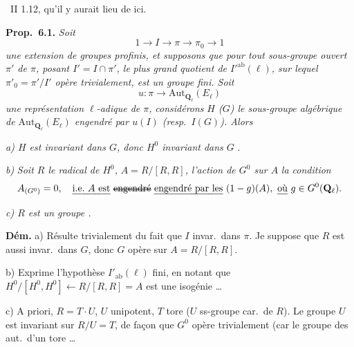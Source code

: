 \documentclass[11pt,a4paper]{article}
\begin{document}
\ II 1.12, qu'il y aurait lieu de  ici.

\textbf{Prop.\ 6.1.} \emph{Soit}
\[ 1 \longrightarrow I \longrightarrow \pi \longrightarrow \pi_{0} \longrightarrow 1 \]
\emph{une extension de groupes profinis, et supposons que pour tout sous-groupe ouvert $\pi'$ de $\pi$, posant $I' = I \cap \pi'$, le}  \emph{ plus grand quotient  de $I'^{\mathrm{ab}}(\ell)$, sur lequel $\pi'_{0} = \pi'/I'$ opère trivialement, est un groupe fini. Soit}
\[ u : \pi \longrightarrow \mathrm{Aut}_{\mathbf{Q}_{\ell}}(E_{\ell}) \]
\emph{une représentation $\ell$-adique de $\pi$,}  \emph{considérons}  \emph{$H$ ($G$) le sous-groupe algébrique de $\mathrm{Aut}_{\mathbf{Q}_{\ell}}(E_{\ell})$ engendré par $u(I)$ (resp.\ $I(G)$). Alors}

\emph{a) $H$ est invariant dans $G$, donc $H^{0}$ invariant dans $G$} .

\emph{b)}  \emph{Soit $R$ le radical de $H^{0}$,}  \emph{$A = R/[R,R]$,} \emph{ l'action de $G^{0}$ sur $A$}   \emph{\ill{} \ill{} la condition}
\[ A_{(G^{0})} = 0 , \quad \text{\emph{i.e.\ $A$ est} \struck{\emph{engendré}} \emph{engendré par les} } (1-g)(A), \ \text{\emph{où} } g \in G^{0}(\mathbf{Q}_{\ell}) . \]

\emph{c) $R$ est un groupe .}

\textbf{Dém.} a) Résulte trivialement du fait que $I$ invar.\ dans $\pi$. Je suppose que $R$ est aussi invar.\ dans $G$, donc $G$ opère sur $A = R/[R,R]$.

b) Exprime l'hypothèse $I'_{\mathrm{ab}}(\ell)$ fini, en notant que $H^{0}/[H^{0},H^{0}] \longleftarrow R/[R,R] = A$ est une isogénie …

c) A priori, $R = T \cdot U$, $U$ unipotent, $T$ tore ($U$ ss-groupe car.\ de $R$). Le groupe $U$ est invariant  sur $R/U = T$, de façon que $G^{0}$ opère trivialement (car le groupe des aut.\ d'un tore  …
\end{document}
